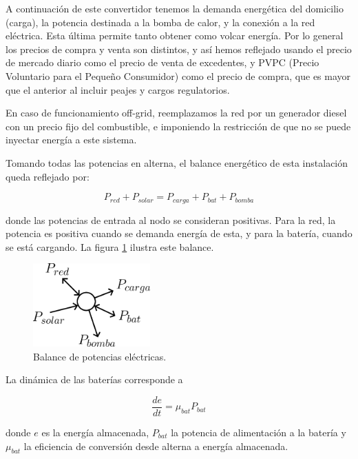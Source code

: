 A continuación de este convertidor tenemos la demanda energética del domicilio
(carga), la potencia destinada a la bomba de calor, y la conexión a la red
eléctrica. Esta última permite tanto obtener como volcar energía. Por lo
general los precios de compra y venta son distintos, y así hemos reflejado
usando el precio de mercado diario como el precio de venta de excedentes, y
PVPC (Precio Voluntario para el Pequeño Consumidor) como el precio de compra,
que es mayor que el anterior al incluir peajes y cargos regulatorios.

En caso de funcionamiento off-grid, reemplazamos la red por un generador
diesel con un precio fijo del combustible, e imponiendo la restricción de que
no se puede inyectar energía a este sistema.

Tomando todas las potencias en alterna, el balance energético de esta
instalación queda reflejado por:

\begin{equation} \label{eq:power_balance}
	P_{red} + P_{solar} = P_{carga} + P_{bat} + P_{bomba}
\end{equation}

donde las potencias de entrada al nodo se consideran positivas. Para la red,
la potencia es positiva cuando se demanda energía de esta, y para la batería,
cuando se está cargando. La figura \ref{fig:electric_node} ilustra este
balance.

\begin{figure}[h] \centering
	\centering
	\includegraphics[width=0.4\textwidth]{./capitulos/resultados_discusion/images/electric_node.png}
	\caption{Balance de potencias eléctricas.}
	\label{fig:electric_node}
\end{figure}

La dinámica de las baterías corresponde a

\begin{equation}
	\frac{de}{dt} = \mu_{bat} P_{bat}
\end{equation}

donde $e$ es la energía almacenada, $P_{bat}$ la potencia de alimentación a la
batería y $\mu_{bat}$ la eficiencia de conversión desde alterna a energía
almacenada.

